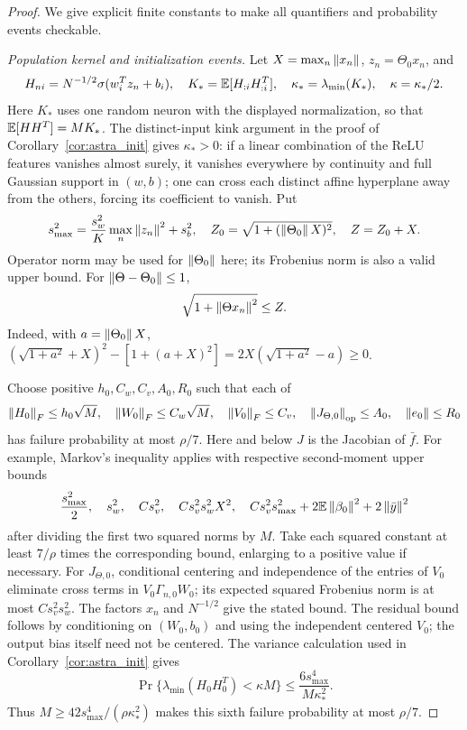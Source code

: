 \begin{proof}
We give explicit finite constants to make all quantifiers and
probability events checkable.

\emph{Population kernel and initialization events.}
Let $X=\max_n\left\lVert x_n\right\rVert$, $z_n=\Theta_0x_n$, and
\[
 H_{ni}=N^{-1/2}\sigma(w_i^Tz_n+b_i),\quad
 K_* =\mathbb{E}[H_{:i}H_{:i}^T],\quad
 \kappa_* =\lambda_{\min}(K_*),\quad \kappa=\kappa_*/2.
\]
Here $K_*$ uses one random neuron with the displayed normalization,
so that $\mathbb{E}[HH^T]=MK_*$. The distinct-input kink argument in the proof
of Corollary~\ref{cor:astra_init} gives $\kappa_*>0$: if a linear
combination of the ReLU features vanishes almost surely, it vanishes
everywhere by continuity and full Gaussian support in $(w,b)$;
one can cross each distinct affine hyperplane away from the others,
forcing its coefficient to vanish.
Put
\[
 s_{\max}^2=\frac{s_w^2}{K}\max_n\left\lVert z_n\right\rVert^2+s_b^2,
 \quad Z_0=\sqrt{1+(\left\lVert\Theta_0\right\rVert X)^2},\quad Z=Z_0+X.
\]
Operator norm may be used for $\left\lVert\Theta_0\right\rVert$ here; its Frobenius
norm is also a valid upper bound. For $\left\lVert\Theta-\Theta_0\right\rVert\le1$,
\begin{equation}\label{eq:astra_zbound}
 \sqrt{1+\left\lVert\Theta x_n\right\rVert^2}\le Z.
\end{equation}
Indeed, with $a=\left\lVert\Theta_0\right\rVert X$,
$(\sqrt{1+a^2}+X)^2-[1+(a+X)^2]
=2X(\sqrt{1+a^2}-a)\ge0$.

Choose positive $h_0,C_w,C_v,A_0,R_0$ such that each of
\begin{equation}\label{eq:astra_fiveevents}
 \left\lVert H_0\right\rVert_F\le h_0\sqrt M,\quad
 \left\lVert W_0\right\rVert_F\le C_w\sqrt M,\quad
 \left\lVert V_0\right\rVert_F\le C_v,\quad
 \left\lVert J_{\Theta,0}\right\rVert_{\rm op}\le A_0,\quad
 \left\lVert e_0\right\rVert\le R_0
\end{equation}
has failure probability at most $\rho/7$. Here and below $J$ is
the Jacobian of $\bar f$. For example, Markov's inequality applies
with respective second-moment upper bounds
\[
 \frac{s_{\max}^2}{2},\quad s_w^2,\quad Cs_v^2,\quad
 Cs_v^2s_w^2X^2,\quad
 Cs_v^2s_{\max}^2+2\mathbb{E}\left\lVert\beta_0\right\rVert^2+2\left\lVert\bar y\right\rVert^2
\]
after dividing the first two squared norms by $M$. Take each squared
constant at least $7/\rho$ times the corresponding bound, enlarging
to a positive value if necessary. For $J_{\Theta,0}$, conditional
centering and independence of the entries of $V_0$ eliminate cross
terms in $V_0\Gamma_{n,0}W_0$; its expected squared Frobenius norm
is at most $Cs_v^2s_w^2$. The factors $x_n$ and $N^{-1/2}$ give the
stated bound. The residual bound follows by conditioning on $(W_0,b_0)$
and using the independent centered $V_0$; the output bias itself need
not be centered.
The variance calculation used in Corollary~\ref{cor:astra_init} gives
\[
 \Pr\{\lambda_{\min}(H_0H_0^T)<\kappa M\}
 \le\frac{6s_{\max}^4}{M\kappa_*^2}.
\]
Thus $M\ge42s_{\max}^4/(\rho\kappa_*^2)$ makes this sixth failure
probability at most $\rho/7$.


\end{proof}
